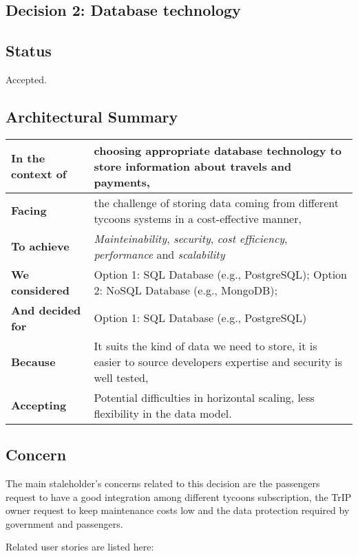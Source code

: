 \subsection{Decision 2: Database technology}

\subsection*{Status}
Accepted.

\subsection*{Architectural Summary}
\begin{tabular}{|p{3.5cm}|p{10.5cm}|}
    \hline
    \textbf{In the context of} & choosing appropriate database technology to store information about travels and payments, \\
    \hline
    \textbf{Facing} & the challenge of storing data coming from different tycoons systems in a cost-effective manner, \\
    \hline
    \textbf{To achieve} & \textit{Mainteinability}, \textit{security}, \textit{cost efficiency}, \textit{performance} and \textit{scalability} \\
    \hline
    \textbf{We considered} & Option 1: SQL Database (e.g., PostgreSQL); Option 2: NoSQL Database (e.g., MongoDB); \\
    \hline
    \textbf{And decided for} & Option 1: SQL Database (e.g., PostgreSQL) \\
    \hline
    \textbf{Because} & It suits the kind of data we need to store, it is easier to source developers expertise and security is well tested, \\
    \hline
    \textbf{Accepting} & Potential difficulties in horizontal scaling, less flexibility in the data model. \\
    \hline
\end{tabular}

\subsection*{Concern}
The main staleholder's concerns related to this decision are the passengers request to have a good integration among different tycoons subscription, the TrIP owner request to keep maintenance costs low and the data protection required by government and passengers.

Related user stories are listed here:

